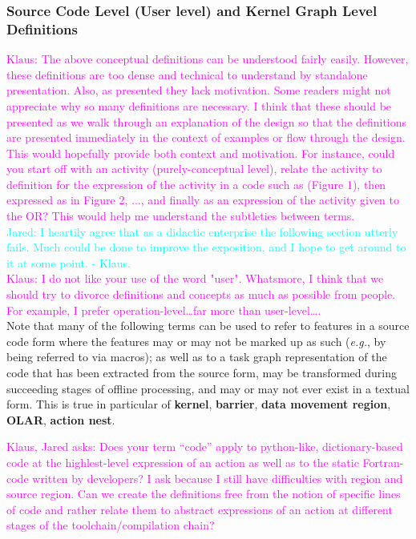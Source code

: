 \documentclass{article}
\newcommand{\eg}{\textit{e.g.}}   %
\newcommand{\JaredRfromKW}[1]   {\textcolor{cyan}{Jared: #1 - Klaus.}}
\newcommand{\Klaus}[1]          {\textcolor{magenta}{Klaus: #1}}
\newcommand{\KlausQfromJO}[1]   {\textcolor{magenta}{Klaus, Jared asks: #1}}
\newcommand{\spelledoutDM}   {data movement region\xspace}
\newcommand{\shortAKG}   {AKG\xspace}
\newcommand{\shortOLAR}  {OLAR\xspace}
\newcommand{\shortOR}   {OR\xspace}
\newcommand{\OLAR}   {\shortOLAR}             %
\newcommand{\OR}        {\shortOR}
\newcommand{\tileloopnest}           {tile-loop nest\xspace}   %
\newcommand{\actionnest}             {action nest\xspace}      %
\begin{document}
\subsubsection[Source Code and \shortAKG Level]{Source Code Level (User level) and Kernel Graph Level Definitions}
\label{sec:PUDCodeTerminology}
\Klaus{The above conceptual definitions can be understood fairly easily.
However, these definitions are too dense and technical to understand by
standalone presentation.  Also, as presented they lack motivation.  Some readers
might not appreciate why so many definitions are necessary.  I think that these should be presented as we walk
through an explanation of the design so that the definitions are presented
immediately in the context of examples or flow through the design.  This would
hopefully provide both context and motivation.  For
instance, could you start off with an activity (purely-conceptual level), relate
the activity to definition for the expression of the activity in a code such as
(Figure 1), then expressed as in Figure 2, ..., and finally as an expression of
the activity given to the \OR?  This would help me understand the subtleties between
terms.}\\
\JaredRfromKW{I heartily agree that as a didactic enterprise the following section
utterly fails. Much could be done to improve the exposition, and I hope to get
around to it at some point.}\\
\Klaus{I do not like your use of the word "user".  Whatsmore, I think that
we should try to divorce definitions and concepts as much as possible from
people.  For example, I prefer operation-level\ldots far more than
user-level\ldots.}\\

Note that many of the following terms can be used to refer to features in a source
code form where the features may or may not be marked up as such (\eg, by being
referred to via macros); as well as to a task graph representation of the
code that has been extracted from the source form, may be transformed
during succeeding stages of offline processing, and may or may not ever
exist in a textual form. This is true in particular of %
\textbf{kernel},
\textbf{barrier},
\textbf{\spelledoutDM},
\textbf{\OLAR},
\textbf{\actionnest}.

\KlausQfromJO{Does your term ``code'' apply to python-like, dictionary-based
code at the highlest-level expression of an action as well as to the static
Fortran-code written by developers?  I ask because I still have difficulties
with region and source region.  Can we create the definitions free from the
notion of specific lines of code and rather relate them to abstract expressions
of an action at different stages of the toolchain/compilation chain?}
\end{document}
